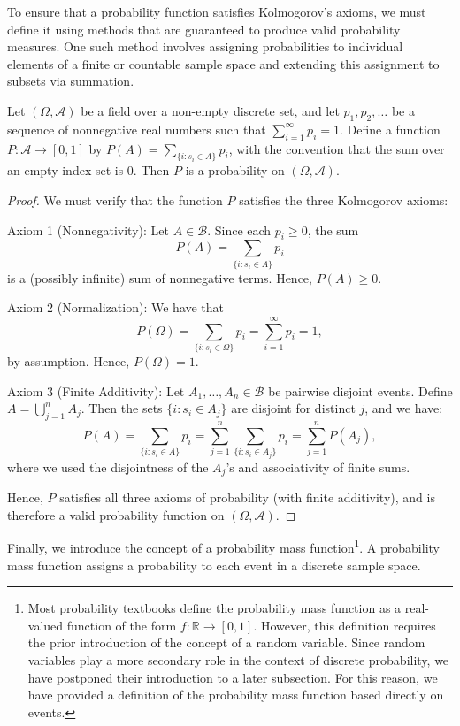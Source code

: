To ensure that a probability function satisfies Kolmogorov's axioms, we must define it using methods that are guaranteed to produce valid probability measures. One such method involves assigning probabilities to individual elements of a finite or countable sample space and extending this assignment to subsets via summation.

\begin{proposition}
Let $\left( \Omega, \mathcal{A} \right)$ be a field over a non-empty discrete set, and let $p_1, p_2, \ldots$ be a sequence of nonnegative real numbers such that $\sum_{i=1}^\infty p_i = 1$. Define a function $P : \mathcal{A} \to [0,1]$ by $P(A) = \sum_{\{ i : s_i \in A \}} p_i$, with the convention that the sum over an empty index set is 0. Then $P$ is a probability on $\left( \Omega, \mathcal{A} \right)$.
\end{proposition}
\begin{proof}
We must verify that the function $P$ satisfies the three Kolmogorov axioms:

Axiom 1 (Nonnegativity): Let $A \in \mathcal{B}$. Since each $p_i \geq 0$, the sum
\[
P(A) = \sum_{\{ i : s_i \in A \}} p_i
\]
is a (possibly infinite) sum of nonnegative terms. Hence, $P(A) \geq 0$.

Axiom 2 (Normalization): We have that
\[
P(\Omega) = \sum_{\{ i : s_i \in \Omega \}} p_i = \sum_{i=1}^\infty p_i = 1,
\]
by assumption. Hence, $P(\Omega) = 1$.

Axiom 3 (Finite Additivity): Let $A_1, \ldots, A_n \in \mathcal{B}$ be pairwise disjoint events. Define $A = \bigcup_{j=1}^n A_j$. Then the sets $\{ i : s_i \in A_j \}$ are disjoint for distinct $j$, and we have:
\[
P(A) = \sum_{\{ i : s_i \in A \}} p_i = \sum_{j=1}^n \sum_{\{ i : s_i \in A_j \}} p_i = \sum_{j=1}^n P(A_j),
\]
where we used the disjointness of the $A_j$'s and associativity of finite sums.

Hence, $P$ satisfies all three axioms of probability (with finite additivity), and is therefore a valid probability function on $\left( \Omega, \mathcal{A} \right)$.
\end{proof}

Finally, we introduce the concept of a probability mass function\footnote{Most probability textbooks define the probability mass function as a real-valued function of the form $f : \mathbb{R} \rightarrow [0, 1]$. However, this definition requires the prior introduction of the concept of a random variable. Since random variables play a more secondary role in the context of discrete probability, we have postponed their introduction to a later subsection. For this reason, we have provided a definition of the probability mass function based directly on events.
}. A probability mass function assigns a probability to each event in a discrete sample space.


